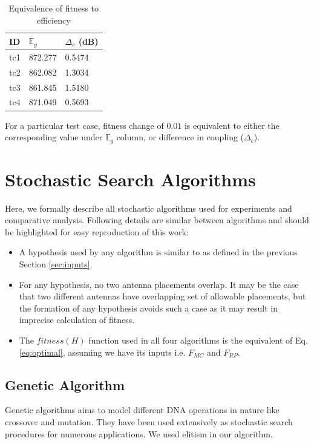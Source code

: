 \documentclass{sig-alternate}
\begin{document}
\begin{table}
\centering
\caption{Equivalence of fitness to efficiency} \label{tab:importance}
  \begin{threeparttable}
      \begin{tabular}{|C{1cm}|C{2.5cm}|C{2.5cm}|} \hline
          ID& $\mathbb E_g$ & $\Delta_{c}$ (dB) \\ \hline
tc1 & 872.277 & 0.5474 \\ \hline
tc2 & 862.082 & 1.3034 \\ \hline
tc3 & 861.845 & 1.5180 \\ \hline
tc4 & 871.049 & 0.5693 \\
\hline\end{tabular}
\begin{tablenotes}
    \small For a particular test case, fitness change of $0.01$ is equivalent to either the corresponding value under $\mathbb E_g$ column, or difference in coupling ($\Delta_c$).  
\end{tablenotes}
\end{threeparttable}
\end{table}

\section{Stochastic Search Algorithms}
\label{sec:algorithms}
Here, we formally describe all stochastic algorithms used for experiments and comparative analysis. Following details are similar between algorithms and should be highlighted for easy reproduction of this work:
\begin{itemize}
    \item A hypothesis used by any algorithm is similar to as defined in the previous Section \ref{sec:inputs}.
    \item For any hypothesis, no two antenna placements overlap. It may be the case that two different antennas have overlapping set of allowable placements, but the formation of any hypothesis avoids such a case as it may result in imprecise calculation of fitness.
    \item The $fitness(H)$ function used in all four algorithms is the equivalent of Eq.\eqref{eq:optimal}, assuming we have its inputs i.e. $F_{MC}$ and $F_{RP}$.
\end{itemize}
\subsection{Genetic Algorithm}
\label{sec:algorithms-ga}
Genetic algorithms aims to model different DNA operations in nature like crossover and mutation. They have been used extensively as stochastic search procedures for numerous applications. We used elitism in our algorithm.
\end{document}
